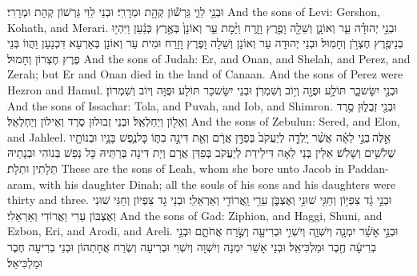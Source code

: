 {וּבְנֵ֖י לֵוִ֑י גֵּרְשׁ֕וֹן קְהָ֖ת וּמְרָרִֽי׃}
{וּבְנֵי לֵוִי גֵּרְשׁוֹן קְהָת וּמְרָרִי׃}
{And the sons of Levi: Gershon, Kohath, and Merari.}{}
{וּבְנֵ֣י יְהוּדָ֗ה עֵ֧ר וְאוֹנָ֛ן וְשֵׁלָ֖ה וָפֶ֣רֶץ וָזָ֑רַח וַיָּ֨מׇת עֵ֤ר וְאוֹנָן֙ בְּאֶ֣רֶץ כְּנַ֔עַן וַיִּהְי֥וּ בְנֵי\maqqaf פֶ֖רֶץ חֶצְרֹ֥ן וְחָמֽוּל׃}
{וּבְנֵי יְהוּדָה עֵר וְאוֹנָן וְשֵׁלָה וָפֶרֶץ וָזָרַח וּמִית עֵר וְאוֹנָן בְּאַרְעָא דִּכְנַעַן וַהֲווֹ בְּנֵי פֶרֶץ חֶצְרוֹן וְחָמוּל׃}
{And the sons of Judah: Er, and Onan, and Shelah, and Perez, and Zerah; but Er and Onan died in the land of Canaan. And the sons of Perez were Hezron and Hamul.}{}
{וּבְנֵ֖י יִשָּׂשכָ֑ר תּוֹלָ֥ע וּפֻוָ֖ה וְי֥וֹב וְשִׁמְרֹֽן׃}
{וּבְנֵי יִשָּׂשכָר תּוֹלָע וּפֻוָּה וְיוֹב וְשִׁמְרוֹן׃}
{And the sons of Issachar: Tola, and Puvah, and Iob, and Shimron.}{}
{וּבְנֵ֖י זְבֻל֑וּן סֶ֥רֶד וְאֵל֖וֹן וְיַחְלְאֵֽל׃}
{וּבְנֵי זְבוּלוּן סֶרֶד וְאֵילוֹן וְיַחְלְאֵל׃}
{And the sons of Zebulun: Sered, and Elon, and Jahleel.}{}
{אֵ֣לֶּה \legarmeh  בְּנֵ֣י לֵאָ֗ה אֲשֶׁ֨ר יָֽלְדָ֤ה לְיַעֲקֹב֙ בְּפַדַּ֣ן אֲרָ֔ם וְאֵ֖ת דִּינָ֣ה בִתּ֑וֹ כׇּל\maqqaf נֶ֧פֶשׁ בָּנָ֛יו וּבְנוֹתָ֖יו שְׁלֹשִׁ֥ים וְשָׁלֹֽשׁ׃}
{אִלֵּין בְּנֵי לֵאָה דִּילֵידַת לְיַעֲקֹב בְּפַדַּן אֲרָם וְיָת דִּינָה בְּרַתֵּיהּ כָּל נְפַשׁ בְּנוֹהִי וּבְנָתֵיהּ תְּלָתִין וּתְלָת׃}
{These are the sons of Leah, whom she bore unto Jacob in Paddan-aram, with his daughter Dinah; all the souls of his sons and his daughters were thirty and three.}{}
{וּבְנֵ֣י גָ֔ד צִפְי֥וֹן וְחַגִּ֖י שׁוּנִ֣י וְאֶצְבֹּ֑ן עֵרִ֥י וַֽאֲרוֹדִ֖י וְאַרְאֵלִֽי׃}
{וּבְנֵי גָד צִפְיוֹן וְחַגִּי שׁוּנִי וְאֶצְבּוֹן עֵרִי וַאֲרוֹדִי וְאַרְאֵלִי׃}
{And the sons of Gad: Ziphion, and Haggi, Shuni, and Ezbon, Eri, and Arodi, and Areli.}{}
{וּבְנֵ֣י אָשֵׁ֗ר יִמְנָ֧ה וְיִשְׁוָ֛ה וְיִשְׁוִ֥י וּבְרִיעָ֖ה וְשֶׂ֣רַח אֲחֹתָ֑ם וּבְנֵ֣י בְרִיעָ֔ה חֶ֖בֶר וּמַלְכִּיאֵֽל׃}
{וּבְנֵי אָשֵׁר יִמְנָה וְיִשְׁוָה וְיִשְׁוִי וּבְרִיעָה וְשֶׂרַח אֲחָתְהוֹן וּבְנֵי בְרִיעָה חֶבֶר וּמַלְכִּיאֵל׃}
